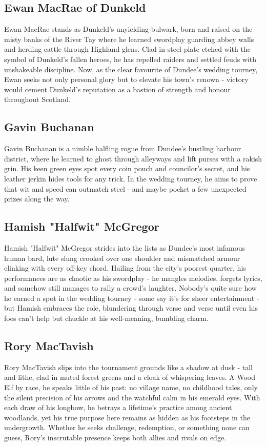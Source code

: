 \subsection{Ewan MacRae of Dunkeld}\label{char:EwanMacRae}
{\entryfont Ewan MacRae stands as Dunkeld's unyielding bulwark, born and raised on the misty banks of the River Tay where he learned swordplay guarding abbey walls and herding cattle through Highland glens. Clad in steel plate etched with the symbol of Dunkeld's fallen heroes, he has repelled raiders and settled feuds with unshakeable discipline. Now, as the clear favourite of Dundee's wedding tourney, Ewan seeks not only personal glory but to elevate his town's renown - victory would cement Dunkeld's reputation as a bastion of strength and honour throughout Scotland.}

\vfill\eject
\subsection{Gavin Buchanan}\label{char:GavinBuchanan}
{\entryfont Gavin Buchanan is a nimble halfling rogue from Dundee's bustling harbour district, where he learned to ghost through alleyways and lift purses with a rakish grin. His keen green eyes spot every coin pouch and councilor's secret, and his leather jerkin hides tools for any trick. In the wedding tourney, he aims to prove that wit and speed can outmatch steel - and maybe pocket a few unexpected prizes along the way.}

\vfill\eject
\subsection{Hamish "Halfwit" McGregor}\label{char:HamishMcGregor}
{\entryfont Hamish "Halfwit" McGregor strides into the lists as Dundee's most infamous human bard, lute slung crooked over one shoulder and mismatched armour clinking with every off-key chord. Hailing from the city's poorest quarter, his performances are as chaotic as his swordplay - he mangles melodies, forgets lyrics, and somehow still manages to rally a crowd's laughter. Nobody's quite sure how he earned a spot in the wedding tourney - some say it's for sheer entertainment - but Hamish embraces the role, blundering through verse and verse until even his foes can't help but chuckle at his well-meaning, bumbling charm.}

\vfill\eject
\subsection{Rory MacTavish}\label{char:RoryMacTavish}
{\entryfont Rory MacTavish slips into the tournament grounds like a shadow at dusk - tall and lithe, clad in muted forest greens and a cloak of whispering leaves. A Wood Elf by race, he speaks little of his past: no village name, no childhood tales, only the silent precision of his arrows and the watchful calm in his emerald eyes. With each draw of his longbow, he betrays a lifetime's practice among ancient woodlands, yet his true purpose here remains as hidden as his footsteps in the undergrowth. Whether he seeks challenge, redemption, or something none can guess, Rory's inscrutable presence keeps both allies and rivals on edge.}
